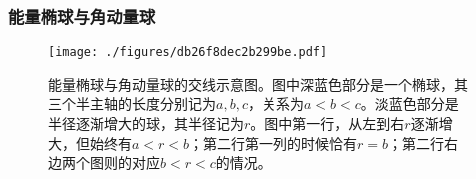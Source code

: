 \subsubsection{能量椭球与角动量球}


\begin{figure}[ht]
\centering
\texttt{[image: ./figures/db26f8dec2b299be.pdf]}
\caption{能量椭球与角动量球的交线示意图。图中深蓝色部分是一个椭球，其三个半主轴的长度分别记为$a, b, c$，关系为$a<b<c$。淡蓝色部分是半径逐渐增大的球，其半径记为$r$。图中第一行，从左到右$r$逐渐增大，但始终有$a<r<b$；第二行第一列的时候恰有$r=b$；第二行右边两个图则的对应$b<r<c$的情况。} \label{fig_Dzhani_7}
\end{figure}


















